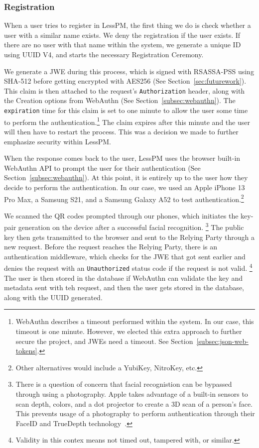 \subsubsection{Registration}
When a user tries to register in LessPM, the first thing we do is check
whether a user with a similar name exists.
We deny the registration if the user exists.
If there are no user with that name within the system, we generate a unique ID
using UUID V4, and starts the necessary Registration Ceremony.

We generate a JWE during this process, which is signed with RSASSA-PSS
using SHA-512 before getting encrypted with AES256 (See
Section~\ref{sec:futurework}).
This claim is then attached to the request's \texttt{Authorization} header,
along with the Creation options from WebAuthn (See
Section~\ref{subsec:webauthn}).
The \texttt{expiration} time for this claim is set to one minute to allow the
user some time to perform the authentication.\footnote{
  WebAuthn describes a timeout performed within the system. In our case, this
  timeout is one minute.
  However, we elected this extra approach to further secure the project, and
  JWEs need a timeout. See Section~\ref{subsec:json-web-tokens}.
}
The claim expires after this minute and the user will then have to restart the
process.
This was a decision we made to further emphasize security within LessPM\@.

When the response comes back to the user, LessPM uses the browser built-in
WebAuthn API to prompt the user for their authentication (See
Section~\ref{subsec:webauthn}).
At this point, it is entirely up to the user how they decide to perform the
authentication.
In our case, we used an Apple iPhone 13 Pro Max, a Samsung S21, and a Samsung
Galaxy A52 to test authentication.\footnote{
  Other alternatives would include a YubiKey, NitroKey, etc.
}

We scanned the QR codes prompted through our phones, which initiates the
key-pair generation on the device after a successful facial recognition.
\footnote{
  There is a question of concern that facial recognistion can be bypassed
  through using a photography.
  Apple takes advantage of a built-in sensors to
  scan depth, colors, and a dot projector to create a 3D scan of a person's
  face.
  This prevents usage of a photography to perform authentication through
  their FaceID and TrueDepth technology~\cite{apple-support}.
}
The public key then gets transmitted to the browser and sent to the Relying
Party through a new request.
Before the request reaches the Relying Party, there is an authentication
middleware, which checks for the JWE that got sent earlier and denies the
request with an \texttt{Unauthorized} status code if the request is not valid.
\footnote{
  Validity in this contex means not timed out, tampered with, or similar.
}
The user is then stored in the database if WebAuthn can validate the key and
metadata sent with teh request, and then the user gets stored in the database,
along with the UUID generated.

